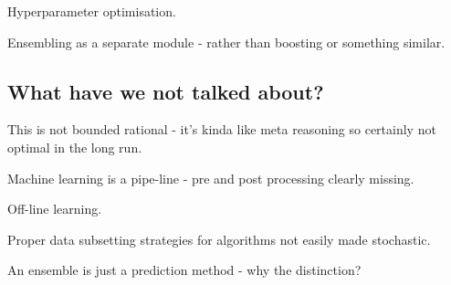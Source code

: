 \documentclass{article} %
\begin{document}
Hyperparameter optimisation.

Ensembling as a separate module - rather than boosting or something similar.

\subsection{What have we not talked about?}

This is not bounded rational - it's kinda like meta reasoning so certainly not optimal in the long run.

Machine learning is a pipe-line - pre and post processing clearly missing.

Off-line learning.

Proper data subsetting strategies for algorithms not easily made stochastic.

An ensemble is just a prediction method - why the distinction?


\small



\end{document}
